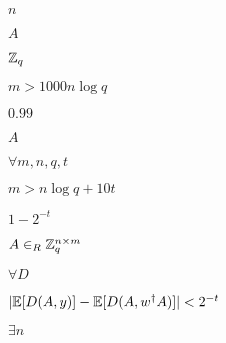 \documentclass[10pt]{book}
\begin{document}
\begin{mdSnippets}
\begin{mdInlineSnippet}[7b8b965ad4bca0e41ab51de7b31363a1]
$n$\end{mdInlineSnippet}%
\begin{mdInlineSnippet}[7fc56270e7a70fa81a5935b72eacbe29]%
$A$\end{mdInlineSnippet}%
\begin{mdInlineSnippet}[b6c02ab1f81305fa30578e3ad5244171]%
$\mathbb{Z}_q$\end{mdInlineSnippet}%
\begin{mdInlineSnippet}[5c6c020e6e73623b0f2a01ba46dc0b3e]%
$m> 1000 n \log q$\end{mdInlineSnippet}%
\begin{mdInlineSnippet}%
$0.99$\end{mdInlineSnippet}%
\begin{mdInlineSnippet}[7fc56270e7a70fa81a5935b72eacbe29]%
$A$\end{mdInlineSnippet}%
\begin{mdInlineSnippet}[2d13f2d6bab7e79b5b527f7085e6e5b3]%
$\forall m,n,q,t$\end{mdInlineSnippet}%
\begin{mdInlineSnippet}%
$m > n \log q + 10t$\end{mdInlineSnippet}%
\begin{mdInlineSnippet}%
$1 - 2^{-t}$\end{mdInlineSnippet}%
\begin{mdInlineSnippet}%
$A \in_R \mathbb{Z}_q^{n \times m}$\end{mdInlineSnippet}%
\begin{mdInlineSnippet}[c792e7f7ca25221f7ce4b0d774f12187]%
$\forall D$\end{mdInlineSnippet}%
\begin{mdInlineSnippet}%
$|\mathbb{E}[D(A,y)] - \mathbb{E}[D(A,w^\dag A)]| < 2^{-t}$\end{mdInlineSnippet}%
\begin{mdInlineSnippet}[2a4631f012e06d2d29fb46e7cdae55dd]%
$\exists n$\end{mdInlineSnippet}%
\begin{mdInlineSnippet}[7fc56270e7a70fa81a5935b72eacbe29]%

\end{mdInlineSnippet}
\end{mdSnippets}
\end{document}
